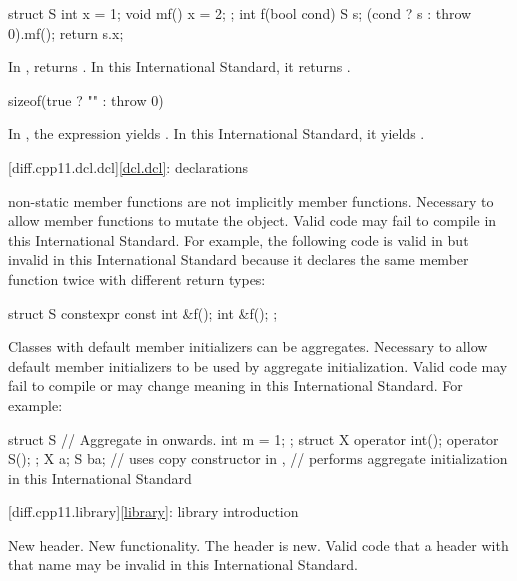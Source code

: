 \begin{codeblock}
struct S {
  int x = 1;
  void mf() { x = 2; }
};
int f(bool cond) {
  S s;
  (cond ? s : throw 0).mf();
  return s.x;
}
\end{codeblock}

In \CppXI{},  returns . In this International Standard,
it returns .

\begin{codeblock}
sizeof(true ? "" : throw 0)
\end{codeblock}

In \CppXI{}, the expression yields . In this
International Standard, it yields .

[diff.cpp11.dcl.dcl]{\ref{dcl.dcl}: declarations}

\change
{} non-static member functions are not implicitly
 member functions.
\rationale
Necessary to allow  member functions to mutate
the object.
\effect
Valid \CppXI{} code may fail to compile in this International Standard.
For example, the following code is valid in \CppXI{}
but invalid in this International Standard because it declares the same member
function twice with different return types:
\begin{codeblock}
struct S {
  constexpr const int &f();
  int &f();
};
\end{codeblock}

\change
Classes with default member initializers can be aggregates.
\rationale
Necessary to allow default member initializers to be used
by aggregate initialization.
\effect
Valid \CppXI{} code may fail to compile or may change meaning in this International Standard.
For example:
\begin{codeblock}
struct S {          // Aggregate in \CppXIV{} onwards.
  int m = 1;
};
struct X {
  operator int();
  operator S();
};
X a{};
S b{a};             // uses copy constructor in \CppXI{},
                    // performs aggregate initialization in this International Standard
\end{codeblock}

[diff.cpp11.library]{\ref{library}: library introduction}

\change
New header.
\rationale
New functionality.
\effect
The \Cpp{} header  is new.
Valid \CppXI{} code that  a header with that name may be
invalid in this International Standard.

